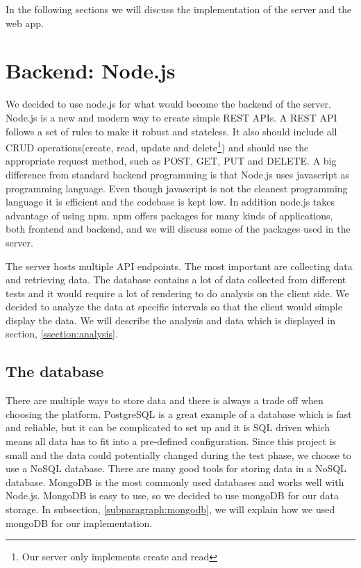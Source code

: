 \documentclass[USenglish]{ifimaster}  %
\begin{document}
In the following sections we will discuss the implementation of the server and the web app.

\section{Backend: Node.js}
We decided to use node.js for what would become the backend of the server. Node.js is a new and modern way to create simple REST APIs. A REST API follows a set of rules to make it robust and stateless. It also should include all CRUD operations(create, read, update and delete\footnote{Our server only implements create and read}) and should use the appropriate request method, such as POST, GET, PUT and DELETE. A big difference from standard backend programming is that Node.js uses javascript as programming language. Even though javascript is not the cleanest programming language it is efficient and the codebase is kept low. In addition node.js takes advantage of using \acrfull{npm}. \acrshort{npm} offers packages for many kinds of applications, both frontend and backend, and we will discuss some of the packages used in the server.

The server hosts multiple API endpoints. The most important are collecting data and retrieving data. The database contains a lot of data collected from different tests and it would require a lot of rendering to do analysis on the client side. We decided to analyze the data at specific intervals so that the client would simple display the data. We will describe the analysis and data which is displayed in section, \vref{ssection:analysis}.

\subsection{The database}
There are multiple ways to store data and there is always a trade off when choosing the platform. PostgreSQL is a great example of a database which is fast and reliable, but it can be complicated to set up and it is SQL driven which means all data has to fit into a pre-defined configuration. Since this project is small and the data could potentially changed during the test phase, we choose to use a NoSQL database. There are many good tools for storing data in a NoSQL database. MongoDB is the most commonly used databases and works well with Node.js. MongoDB is easy to use, so we decided to use mongoDB for our data storage. In subsection, \vref{subparagraph:mongodb}, we will explain how we used mongoDB for our implementation.
\end{document}
